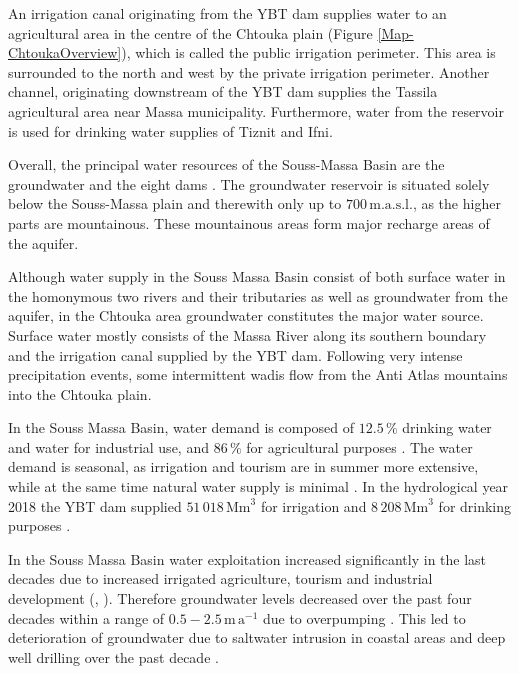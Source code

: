 An irrigation canal originating from the YBT dam supplies water to an agricultural area in the centre of the Chtouka plain (Figure \ref{Map-ChtoukaOverview}), which is called the public irrigation perimeter. 
This area is surrounded to the north and west by the private irrigation perimeter. 
Another channel, originating downstream of the YBT dam supplies the Tassila agricultural area near Massa municipality. 
Furthermore, water from the reservoir is used for drinking water supplies of Tiznit and Ifni.

Overall, the principal water resources of the Souss-Massa Basin are the groundwater and the eight dams \parencite{Hssaisoune.2017}. 
The groundwater reservoir is situated solely below the Souss-Massa plain and therewith only up to $700 \, \textrm{m.a.s.l.}$, as the higher parts are mountainous. 
These mountainous areas form major recharge areas of the aquifer.

Although water supply in the Souss Massa Basin consist of both surface water in the homonymous two rivers and their tributaries as well as groundwater from the aquifer, in the Chtouka area groundwater constitutes the major water source. 
Surface water mostly consists of the Massa River along its southern boundary and the irrigation canal supplied by the YBT dam. 
Following very intense precipitation events, some intermittent wadis flow from the Anti Atlas mountains into the Chtouka plain.

In the Souss Massa Basin, water demand is composed of $12.5 \, \%$ drinking water and water for industrial use, and $86 \, \%$ for agricultural purposes \parencite{Choukr.2017}. 
The water demand is seasonal, as irrigation and tourism are in summer more extensive, while at the same time natural water supply is minimal \parencite{Choukr.2017}. 
In the hydrological year 2018 the YBT dam supplied $51 \,018 \, \textrm{Mm}^3$ for irrigation and $8 \, 208 \, \textrm{Mm}^3$ for drinking purposes \parencite{ABHSM-HydStats.2022}.

In the Souss Massa Basin water exploitation increased significantly in the last decades due to increased irrigated agriculture, tourism and industrial development (\cite{Choukr.2017}, \cite{Hssaisoune.2017}). 
Therefore groundwater levels decreased over the past four decades within a range of $0.5 - 2.5 \, \textrm{m}\, \textrm{a}^{-1}$ due to overpumping \parencite{Choukr.2017} \parencite{Hssaisoune.2017}. 
This led to deterioration of groundwater due to saltwater intrusion in coastal areas and deep well drilling over the past decade \parencite{Choukr.2017}.

